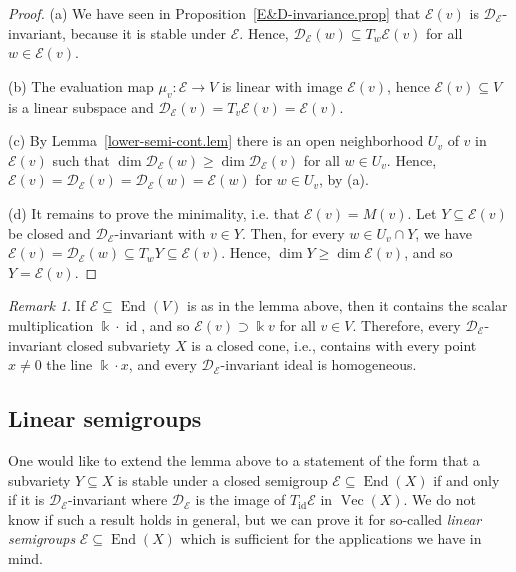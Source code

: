 \documentclass{amsart}
\theoremstyle{definition}
\theoremstyle{remark}
\newtheorem{rem}[thm]{Remark}
\begin{document}
\begin{proof}
(a) 
We have seen in Proposition~\ref{E&D-invariance.prop} that ${\mathcal E}(v)$ is ${\mathcal D}_{\mathcal E}$-invariant, because it is stable under ${\mathcal E}$. Hence, ${\mathcal D}_{\mathcal E}(w) {\subseteq} T_{w}{\mathcal E}(v)$ for all $w \in {\mathcal E}(v)$.
\par\smallskip
(b) The evaluation map $\mu_{v}\colon {\mathcal E} \to V$ is linear with image ${\mathcal E}(v)$, hence ${\mathcal E}(v) {\subseteq} V$ is a linear subspace and ${\mathcal D}_{\mathcal E}(v) = T_{v}{\mathcal E}(v) = {\mathcal E}(v)$.
\par\smallskip
(c) By Lemma~\ref{lower-semi-cont.lem} there is an open neighborhood  $U_{v}$ of $v$ in ${\mathcal E}(v)$ such that $\dim{\mathcal D}_{\mathcal E}(w) \geq \dim{\mathcal D}_{\mathcal E}(v)$ for all $w \in U_{v}$. Hence, ${\mathcal E}(v)={\mathcal D}_{\mathcal E}(v) = {\mathcal D}_{\mathcal E}(w)={\mathcal E}(w)$ for $w \in U_{v}$, by (a).
\par\smallskip
(d) It remains to prove the minimality, i.e. that ${\mathcal E}(v) = M(v)$. Let $Y {\subseteq} {\mathcal E}(v)$ be closed and ${\mathcal D}_{\mathcal E}$-invariant with $v \in Y$. Then, for every $w \in U_{v}\cap Y$, we have ${\mathcal E}(v) = {\mathcal D}_{\mathcal E}(w) {\subseteq} T_{w}Y {\subseteq} {\mathcal E}(v)$. Hence, $\dim Y \geq \dim {\mathcal E}(v)$, and so $Y = {\mathcal E}(v)$.
\end{proof}

\begin{rem}\label{closed-cone.rem}
If ${\mathcal E} {\subseteq} \operatorname{End}(V)$ is as in the lemma above, then it contains the scalar multiplication ${\Bbbk} \cdot\operatorname{id}$, and so ${\mathcal E}(v) \supset {\Bbbk} v$ for all $v \in V$. Therefore, every ${\mathcal D}_{\mathcal E}$-invariant closed subvariety $X$ is a closed cone, i.e., contains with every point $x\neq 0$ the line ${\Bbbk}\cdot x$, and  every ${\mathcal D}_{\mathcal E}$-invariant ideal is homogeneous.
\end{rem}

{\par\smallskip}
\subsection{Linear semigroups}
One would like to extend the lemma above to a statement of the form that a subvariety $Y {\subseteq} X$ is stable under a closed semigroup ${\mathcal E} {\subseteq} \operatorname{End}(X)$ if and only if it is ${\mathcal D}_{\mathcal E}$-invariant where ${\mathcal D}_{\mathcal E}$ is the image of $T_\operatorname{id}{\mathcal E}$ in $\operatorname{Vec}(X)$. We do not know if such a result holds in general, but we can prove it for so-called {\it linear semigroups\/} ${\mathcal E} {\subseteq} \operatorname{End}(X)$ which is sufficient for the applications we have in mind.
\end{document}
